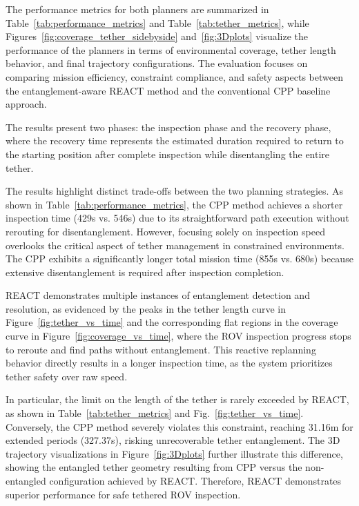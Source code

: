 The performance metrics for both planners are summarized in Table~\ref{tab:performance_metrics} and Table~\ref{tab:tether_metrics}, while Figures~\ref{fig:coverage_tether_sidebyside} and~\ref{fig:3Dplots} visualize the performance of the planners in terms of environmental coverage, tether length behavior, and final trajectory configurations. The evaluation focuses on comparing mission efficiency, constraint compliance, and safety aspects between the entanglement-aware \ac{REACT} method and the conventional \ac{CPP} baseline approach.

The results present two phases: the inspection phase and the recovery phase, where the recovery time represents the estimated duration required to return to the starting position after complete inspection while disentangling the entire tether.

The results highlight distinct trade-offs between the two planning strategies. As shown in Table~\ref{tab:performance_metrics}, the \ac{CPP} method achieves a shorter inspection time (429s vs. 546s) due to its straightforward path execution without rerouting for disentanglement. However, focusing solely on inspection speed overlooks the critical aspect of tether management in constrained environments. The \ac{CPP} exhibits a significantly longer total mission time (855s vs. 680s) because extensive disentanglement is required after inspection completion.

\ac{REACT} demonstrates multiple instances of entanglement detection and resolution, as evidenced by the peaks in the tether length curve in Figure~\ref{fig:tether_vs_time} and the corresponding flat regions in the coverage curve in Figure~\ref{fig:coverage_vs_time}, where the \ac{ROV} inspection progress stops to reroute and find paths without entanglement. This reactive replanning behavior directly results in a longer inspection time, as the system prioritizes tether safety over raw speed.

In particular, the limit on the length of the tether is rarely exceeded by \ac{REACT}, as shown in Table~\ref{tab:tether_metrics} and Fig.~\ref{fig:tether_vs_time}. Conversely, the \ac{CPP} method severely violates this constraint, reaching 31.16m for extended periods (327.37s), risking unrecoverable tether entanglement. The 3D trajectory visualizations in Figure~\ref{fig:3Dplots} further illustrate this difference, showing the entangled tether geometry resulting from \ac{CPP} versus the non-entangled configuration achieved by \ac{REACT}. Therefore, \ac{REACT} demonstrates superior performance for safe tethered \ac{ROV} inspection.
